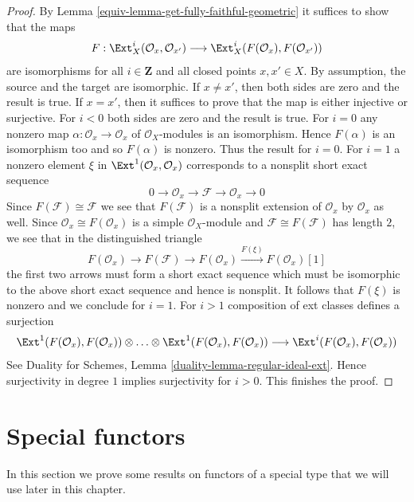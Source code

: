 \begin{proof}

By Lemma \ref{equiv-lemma-get-fully-faithful-geometric} it suffices to show
that the maps
$$
F : \Ext^i_X(\mathcal{O}_x, \mathcal{O}_{x'})
\longrightarrow
\Ext^i_X(F(\mathcal{O}_x), F(\mathcal{O}_{x'}))
$$
are isomorphisms for all $i \in \mathbf{Z}$ and all closed points
$x, x' \in X$. By assumption, the source and the target are isomorphic.
If $x \not = x'$, then both sides are zero and the result is true.
If $x = x'$, then it suffices to prove that the map is either injective
or surjective. For $i < 0$ both sides are zero and the result is true.
For $i = 0$ any nonzero map $\alpha : \mathcal{O}_x \to \mathcal{O}_x$ of
$\mathcal{O}_X$-modules is an isomorphism. Hence $F(\alpha)$ is an
isomorphism too and so $F(\alpha)$ is nonzero. Thus the result for $i = 0$.
For $i = 1$ a nonzero element $\xi$ in $\Ext^1(\mathcal{O}_x, \mathcal{O}_x)$
corresponds to a nonsplit short exact sequence
$$
0 \to \mathcal{O}_x \to \mathcal{F} \to \mathcal{O}_x \to 0
$$
Since $F(\mathcal{F}) \cong \mathcal{F}$ we see that $F(\mathcal{F})$
is a nonsplit extension of $\mathcal{O}_x$ by $\mathcal{O}_x$ as well.
Since $\mathcal{O}_x \cong F(\mathcal{O}_x)$ is a simple
$\mathcal{O}_X$-module and $\mathcal{F} \cong F(\mathcal{F})$ has
length $2$, we see that in the distinguished triangle
$$
F(\mathcal{O}_x) \to F(\mathcal{F}) \to F(\mathcal{O}_x)
\xrightarrow{F(\xi)} F(\mathcal{O}_x)[1]
$$
the first two arrows must form a short exact sequence which must be
isomorphic to the above short exact sequence and hence is nonsplit.
It follows that $F(\xi)$ is nonzero and we conclude for $i = 1$.
For $i > 1$ composition of ext classes defines a surjection
$$
\Ext^1(F(\mathcal{O}_x), F(\mathcal{O}_x)) \otimes \ldots \otimes
\Ext^1(F(\mathcal{O}_x), F(\mathcal{O}_x))
\longrightarrow
\Ext^i(F(\mathcal{O}_x), F(\mathcal{O}_x))
$$
See Duality for Schemes, Lemma \ref{duality-lemma-regular-ideal-ext}.
Hence surjectivity in degree $1$ implies surjectivity for $i > 0$.
This finishes the proof.
\end{proof}

\section{Special functors}
\label{equiv-section-special-functors}
In this section we prove some results on functors of a special type
that we will use later in this chapter.

